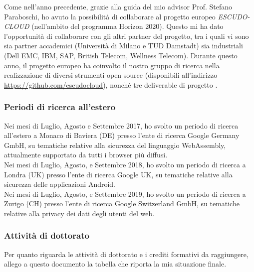 \documentclass{article}
\begin{document}
Come nell'anno precedente, grazie alla guida del mio advisor Prof. Stefano Paraboschi, ho avuto la possibilità di collaborare al progetto europeo {\em ESCUDO-CLOUD} (nell'ambito del programma Horizon 2020). Questo mi ha dato l'opportunità di collaborare con gli altri partner del progetto, tra i quali vi sono sia partner accademici (Università di Milano e TUD Damstadt) sia industriali (Dell EMC, IBM, SAP, British Telecom, Wellness Telecom).
Durante questo anno, il progetto europeo ha coinvolto il nostro gruppo di ricerca nella realizzazione di diversi strumenti open source (disponibili all'indirizzo \url{https://github.com/escudocloud}), nonché tre deliverable di progetto \cite{D26, D35, D44}.
\\

\subsubsection*{Periodi di ricerca all'estero}

Nei mesi di Luglio, Agosto e Settembre 2017, ho svolto un periodo di ricerca all'estero a Monaco di Baviera (DE) presso l'ente di ricerca Google Germany GmbH, su tematiche relative alla sicurezza del linguaggio WebAssembly, attualmente supportato da tutti i browser più diffusi.
\\

Nei mesi di Luglio, Agosto, e Settembre 2018, ho svolto un periodo di ricerca a Londra (UK) presso l'ente di ricerca Google UK, su tematiche relative alla sicurezza delle applicazioni Android.
\\

Nei mesi di Luglio, Agosto, e Settembre 2019, ho svolto un periodo di ricerca a Zurigo (CH) presso l'ente di ricerca Google Switzerland GmbH, su tematiche relative alla privacy dei dati degli utenti del web. 


\subsubsection*{Attività di dottorato}

Per quanto riguarda le attività di dottorato e i crediti formativi da raggiungere, allego a questo documento la tabella che riporta la mia situazione finale.

\vspace{20px}



\end{document}
